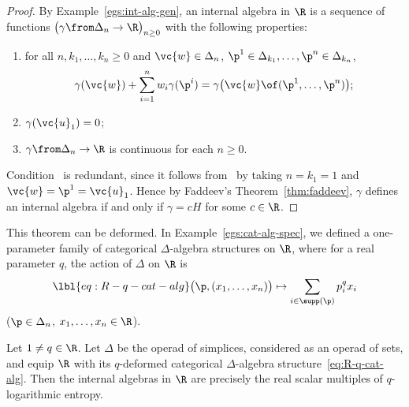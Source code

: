 \begin{proof}
By Example~\ref{egs:int-alg-gen}, an internal
algebra in $\R$ is a sequence of functions $\bigl( \gamma \from \Delta_n
\to \R \bigr)_{n \geq 0}$ with the following properties:
% 
\begin{enumerate}
\item 
{}
for all $n, k_1, \ldots, k_n \geq 0$ and $\vc{w} \in \Delta_n$, $\p^1
\in \Delta_{k_1}, \ldots, \p^n \in \Delta_{k_n}$,
\[
\gamma(\vc{w}) + \sum_{i = 1}^n w_i \gamma(\p^i)
=
\gamma\bigl(\vc{w} \of (\p^1, \ldots, \p^n)\bigr);
\]

\item
{}
$\gamma(\vc{u}_1) = 0$;

\item
$\gamma \from \Delta_n \to \R$ is continuous for each $n \geq 0$.
\end{enumerate}
% 
Condition~ is redundant, since it follows
from~ by taking $n = k_1 = 1$ and $\vc{w} = \p^1 =
\vc{u}_1$.  Hence by Faddeev's Theorem~\ref{thm:faddeev}, $\gamma$ defines
an internal algebra if and only if $\gamma = cH$ for some $c \in \R$.
\end{proof}

This theorem can be deformed.%
%
%
In Example~\ref{egs:cat-alg-spec}, we defined 
a one-parameter family of categorical $\Delta$-algebra structures
on $\R$, where for a real parameter $q$, the action of $\Delta$ on
$\R$ is 
% 
\begin{equation}
\lbl{eq:R-q-cat-alg}
\bigl(\p, (x_1, \ldots, x_n)\bigr) 
\mapsto 
\sum_{i \in \supp(\p)} p_i^q x_i
\end{equation}
% 
($\p \in \Delta_n$, $x_1, \ldots, x_n \in \R$).  

\begin{thm}
%
% 
Let $1 \neq q \in \R$.  Let $\Delta$ be the operad of simplices, considered
as an operad of sets, and equip $\R$ with its $q$-deformed categorical
$\Delta$-algebra structure~\eqref{eq:R-q-cat-alg}.  Then the internal
algebras in $\R$ are precisely the real scalar multiples of $q$-logarithmic
entropy.%
%
\end{thm}

